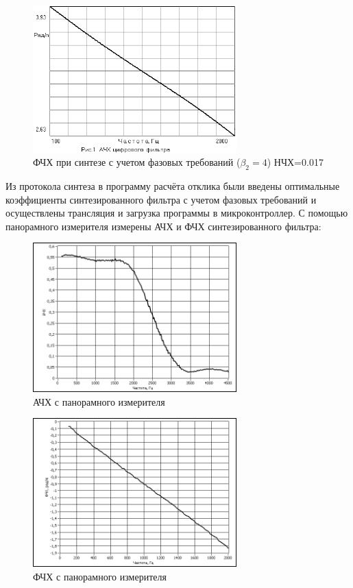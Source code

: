 \begin{figure}[H]
  \centering
  \includegraphics[width=0.7\textwidth]{data/Z4_FN4/Faza(4).png}
  \caption{ФЧХ при синтезе с учетом фазовых требований ($\beta_2=4$) НЧХ=0.017}
  \label{fig:}
\end{figure}

Из протокола синтеза в программу расчёта отклика были введены оптимальные коэффициенты синтезированного фильтра с учетом фазовых требований и осуществлены трансляция и загрузка программы в микроконтроллер. С помощью панорамного измерителя  измерены АЧХ и ФЧХ синтезированного фильтра:

\begin{figure}[H]
  \centering
  \includegraphics[width=0.7\textwidth]{data/Z4_FN4/Gain(4)_Pan.png}
  \caption{АЧХ с панорамного измерителя}
  \label{fig:}
\end{figure}

\begin{figure}[H]
  \centering
  \includegraphics[width=0.7\textwidth]{data/Z4_FN4/Faza(4)_Pan_Faza.png}
  \caption{ФЧХ с панорамного измерителя}
  \label{fig:}
\end{figure}

